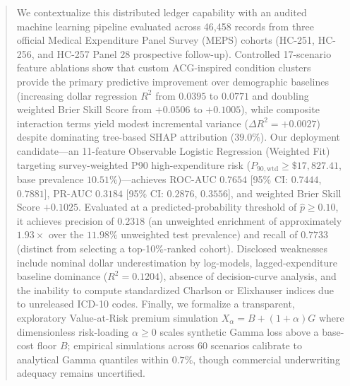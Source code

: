 \documentclass[runningheads]{llncs}
\begin{document}
\begin{abstract}
We contextualize this distributed ledger capability with an audited machine learning pipeline evaluated across 46,458 records from three official Medical Expenditure Panel Survey (MEPS) cohorts (HC-251, HC-256, and HC-257 Panel 28 prospective follow-up). Controlled 17-scenario feature ablations show that custom ACG-inspired condition clusters provide the primary predictive improvement over demographic baselines (increasing dollar regression $R^2$ from $0.0395$ to $0.0771$ and doubling weighted Brier Skill Score from $+0.0506$ to $+0.1005$), while composite interaction terms yield modest incremental variance ($\Delta R^2 = +0.0027$) despite dominating tree-based SHAP attribution ($39.0\%$). Our deployment candidate---an 11-feature Observable Logistic Regression (Weighted Fit) targeting survey-weighted P90 high-expenditure risk ($P_{90,\text{wtd}} \ge \$17,827.41$, base prevalence $10.51\%$)---achieves ROC-AUC $0.7654$ [95\% CI: $0.7444$, $0.7881$], PR-AUC $0.3184$ [95\% CI: $0.2876$, $0.3556$], and weighted Brier Skill Score $+0.1025$. Evaluated at a predicted-probability threshold of $\hat{p} \ge 0.10$, it achieves precision of $0.2318$ (an unweighted enrichment of approximately $1.93\times$ over the $11.98\%$ unweighted test prevalence) and recall of $0.7733$ (distinct from selecting a top-10\%-ranked cohort). Disclosed weaknesses include nominal dollar underestimation by log-models, lagged-expenditure baseline dominance ($R^2 = 0.1204$), absence of decision-curve analysis, and the inability to compute standardized Charlson or Elixhauser indices due to unreleased ICD-10 codes. Finally, we formalize a transparent, exploratory Value-at-Risk premium simulation $X_\alpha = B + (1+\alpha)G$ where dimensionless risk-loading $\alpha \ge 0$ scales synthetic Gamma loss above a base-cost floor $B$; empirical simulations across 60 scenarios calibrate to analytical Gamma quantiles within $0.7\%$, though commercial underwriting adequacy remains uncertified.

\end{abstract}

\end{document}
